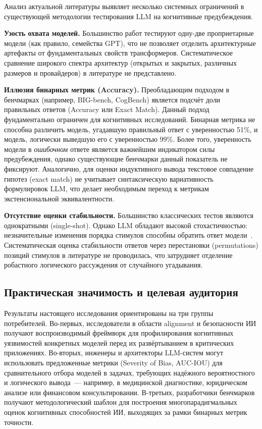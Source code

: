 Анализ актуальной литературы выявляет несколько системных ограничений в существующей методологии тестирования LLM на когнитивные предубеждения.

\textbf{Узость охвата моделей.} Большинство работ тестируют одну-две проприетарные модели (как правило, семейства GPT), что не позволяет отделить архитектурные артефакты от фундаментальных свойств трансформеров. Систематическое сравнение широкого спектра архитектур (открытых и закрытых, различных размеров и провайдеров) в литературе не представлено.

\textbf{Иллюзия бинарных метрик (Accuracy).} Преобладающим подходом в бенчмарках (например, BIG-bench, CogBench) является подсчёт доли правильных ответов (Accuracy или Exact Match). Данный подход фундаментально ограничен для когнитивных исследований. Бинарная метрика не способна различить модель, угадавшую правильный ответ с уверенностью 51\%, и модель, логически выведшую его с уверенностью 99\%. Более того, уверенность модели в \textit{ошибочном} ответе является важнейшим индикатором силы предубеждения, однако существующие бенчмарки данный показатель не фиксируют. Аналогично, для оценки индуктивного вывода текстовое совпадение гипотез (exact match) не учитывает синтаксическую вариативность формулировок LLM, что делает необходимым переход к метрикам экстенсиональной эквивалентности.

\textbf{Отсутствие оценки стабильности.} Большинство классических тестов являются однократными (single-shot). Однако LLM обладают высокой стохастичностью: незначительные изменения порядка стимулов способны обратить ответ модели~\cite{binz2023using}. Систематическая оценка стабильности ответов через перестановки (permutations) позиций стимулов в литературе не проводилась, что затрудняет отделение робастного логического рассуждения от случайного угадывания.

\subsection{Практическая значимость и целевая аудитория}

Результаты настоящего исследования ориентированы на три группы потребителей. 
Во-первых, исследователи в области alignment и безопасности ИИ получают 
воспроизводимый фреймворк для профилирования когнитивных уязвимостей конкретных 
моделей перед их развёртыванием в критических приложениях. Во-вторых, инженеры 
и архитекторы LLM-систем могут использовать предложенные метрики (Severity of 
Bias, AUC-IOU) для сравнительного отбора моделей в задачах, требующих надёжного 
вероятностного и логического вывода~--- например, в медицинской диагностике, 
юридическом анализе или финансовом консультировании. В-третьих, разработчики 
бенчмарков получают методологический шаблон для построения многопарадигмальных 
оценок когнитивных способностей ИИ, выходящих за рамки бинарных метрик точности.

